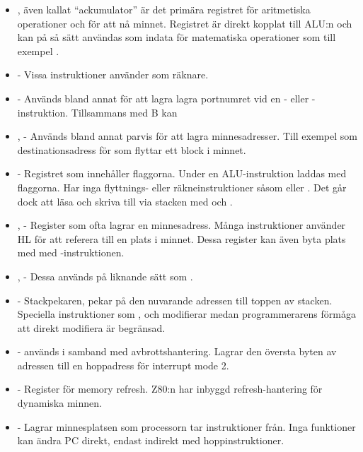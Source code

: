 \documentclass[main.tex]{subfiles}
\begin{document}
\begin{itemize}
    \item {}, även kallat ``ackumulator'' är det primära registret för
        aritmetiska operationer och för att nå minnet. Registret är direkt
        kopplat till ALU:n och kan på så sätt användas som indata för
        matematiska operationer som till exempel .
    \item {} - Vissa instruktioner använder  som räknare.
    \item {} - Används bland annat för att lagra lagra portnumret vid en
        - eller -instruktion. Tillsammans med B kan
    \item {},  - Används bland annat parvis för att lagra
        minnesadresser. Till exempel som destinationsadress för 
        som flyttar ett block i minnet.
    \item {} - Registret som innehåller flaggorna. Under en
        ALU-instruktion laddas  med flaggorna. Har inga flyttnings-
        eller räkneinstruktioner såsom  eller . Det går dock
        att läsa och skriva till  via stacken med  och
        .
    \item {},  - Register som ofta lagrar en minnesadress. Många instruktioner
        använder HL för att referera till en plats i minnet. Dessa register kan
        även byta plats med  med -instruktionen.
    \item {},  - Dessa används på liknande sätt som .
    \item {} - Stackpekaren, pekar på den nuvarande adressen till toppen av
        stacken. Speciella instruktioner som ,  och
         modifierar  medan programmerarens förmåga att
        direkt modifiera  är begränsad.
    \item {} -  används i samband med avbrottshantering. Lagrar
        den översta byten av adressen till en hoppadress för interrupt mode
        2.
    \item {} - Register för memory refresh. Z80:n har inbyggd
        refresh-hantering för dynamiska minnen.
    \item {} - Lagrar minnesplatsen som processorn tar instruktioner
        från. Inga funktioner kan ändra PC direkt, endast indirekt med
        hoppinstruktioner.
\end{itemize}
\end{document}
